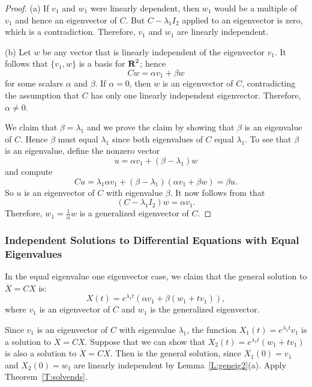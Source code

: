 \documentclass{ximera}
\begin{document}
\begin{proof}  (a) If $v_1$ and $w_1$ were linearly dependent, then $w_1$ would be 
a multiple of $v_1$ and hence an eigenvector of $C$.  But $C-\lambda_1I_2$
applied to an eigenvector is zero, which is a contradiction.  Therefore, 
$v_1$ and $w_1$ are linearly independent.

(b) Let $w$ be any vector that is linearly independent of
the eigenvector $v_1$.  It follows that  $\{v_1,w\}$ is a basis for
$\mbox{$\bf{R}$}^2$; hence
\begin{equation} \label{E:Cw1}
Cw = \alpha v_1 + \beta w
\end{equation}
for some scalars $\alpha$ and $\beta$.    If $\alpha=0$, then
$w$ is an eigenvector of $C$, contradicting the assumption that $C$ has
only one linearly independent eigenvector.  Therefore, $\alpha\neq 0$.

We claim that $\beta=\lambda_1$ and we prove the claim by showing that
$\beta$ is an eigenvalue of $C$.  Hence $\beta$ must equal $\lambda_1$
since both eigenvalues of $C$ equal $\lambda_1$.  To see that $\beta$
is an eigenvalue, define the nonzero vector
\[
u = \alpha v_1 +(\beta-\lambda_1)w
\]
and compute
\[
Cu = \lambda_1 \alpha v_1 + (\beta-\lambda_1)(\alpha v_1+\beta w) =
\beta u.
\]
So $u$ is an eigenvector of $C$ with eigenvalue $\beta$.
It now follows from  that
\[
(C-\lambda_1I_2)w = \alpha v_1.
\]
Therefore, $w_1=\frac{1}{\alpha}w$ is a generalized eigenvector
of $C$.  \end{proof}



\subsubsection*{Independent Solutions to Differential Equations with
Equal Eigenvalues}

In the equal eigenvalue one eigenvector case, we
claim that the general solution to $\dot{X}=CX$ is:
\begin{equation}  \label{e:exp1eva}
X(t) = e^{\lambda_1 t}\left(\alpha v_1 +\beta (w_1+tv_1)\right),
\end{equation}
where $v_1$ is an eigenvector of $C$ and $w_1$ is the generalized
eigenvector.

Since $v_1$ is an eigenvector of $C$ with eigenvalue $\lambda_1$, the
function $X_1(t)=e^{\lambda_1 t}v_1$ is a solution to $\dot{X}=CX$.  Suppose
that we can show that $X_2(t)=e^{\lambda_1 t}(w_1+tv_1)$ is also a solution
to $\dot{X}=CX$.  Then  is the general solution, since
$X_1(0)=v_1$ and $X_2(0)=w_1$ are linearly independent by 
Lemma~\ref{L:geneig2}(a).  Apply Theorem~\ref{T:solvends}.
\end{document}
